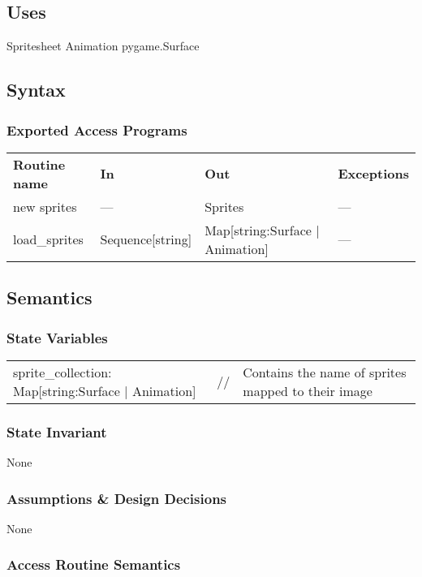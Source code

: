 \documentclass[12pt]{article}
\begin{document}
\subsection* {Uses}
Spritesheet
Animation
pygame.Surface
\subsection* {Syntax}

\subsubsection* {Exported Access Programs}

\begin{tabular}{| l | l | l | l |}
\hline
\textbf{Routine name} & \textbf{In} & \textbf{Out} & \textbf{Exceptions}\\
new sprites & --- & Sprites & ---\\
\hline
load\_sprites & Sequence[string] & Map[string:Surface | Animation] & ---\\
\hline
\end{tabular}

\subsection* {Semantics}

\subsubsection* {State Variables}

\begin{tabular}{lll}
    sprite\_collection: Map[string:Surface | Animation] & // & Contains the name of sprites mapped to their image
\end{tabular}

\subsubsection* {State Invariant}

None

\subsubsection* {Assumptions \& Design Decisions}

None

\subsubsection* {Access Routine Semantics}
\end{document}

